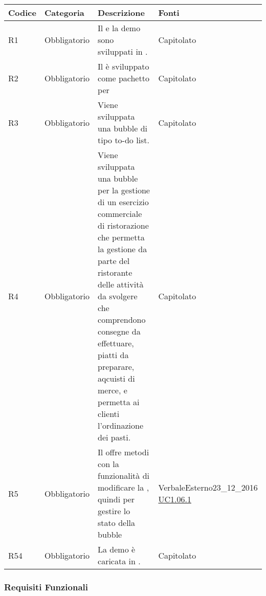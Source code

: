 \begin{longtable}{|P{1.5cm}|P{3cm}|P{6cm}|P{2.5cm}|}
	\hline \textbf{Codice} & \textbf{Categoria} & \textbf{Descrizione} & \textbf{Fonti} \\
	\hline R1 & Obbligatorio & Il  e la demo sono sviluppati in . & Capitolato \\
	\hline R2 & Obbligatorio & Il  è sviluppato come pachetto per  & Capitolato \\
	\hline R3 & Obbligatorio & Viene sviluppata una bubble di tipo to-do list. & Capitolato \\
	\hline R4 & Obbligatorio & Viene sviluppata una bubble per la gestione di un esercizio commerciale di ristorazione che permetta la gestione da parte del ristorante delle attività da svolgere che comprendono consegne da effettuare,  piatti da preparare, aqcuisti di merce, e permetta ai clienti l’ordinazione dei pasti. & Capitolato \\
	\hline R5 & Obbligatorio & Il  offre metodi con la funzionalità di modificare la , quindi per gestire lo stato della bubble & VerbaleEsterno23\_12\_2016 \linebreak \hyperref[UC1.06.1]{UC1.06.1}  \\
	\hline R54 & Obbligatorio & La demo è caricata in . & Capitolato \\
	\hline
\end{longtable}

\subsubsection{Requisiti Funzionali}

